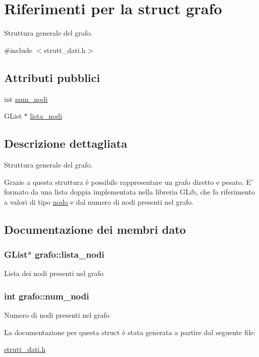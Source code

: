 \hypertarget{structgrafo}{\section{Riferimenti per la struct grafo}
\label{structgrafo}
}


Struttura generale del grafo.  




{\ttfamily \#include $<$strutt\+\_\+dati.\+h$>$}

\subsection*{Attributi pubblici}
\begin{DoxyCompactItemize}
\item 
int \hyperlink{structgrafo_ab05142298c5857ab9e14b52f4b3820e1}{num\+\_\+nodi}
\item 
G\+List $\ast$ \hyperlink{structgrafo_a95906e11ba3224fa9fed6b8b2882e576}{lista\+\_\+nodi}
\end{DoxyCompactItemize}


\subsection{Descrizione dettagliata}
Struttura generale del grafo. 

Grazie a questa struttura è possibile rappresentare un grafo diretto e pesato. E' formato da una lista doppia implementata nella libreria G\+Lib, che fa riferimento a valori di tipo \hyperlink{structnodo}{nodo} e dal numero di nodi presenti nel grafo. 

\subsection{Documentazione dei membri dato}
\hypertarget{structgrafo_a95906e11ba3224fa9fed6b8b2882e576}{
\subsubsection[{lista\+\_\+nodi}]{\setlength{\rightskip}{0pt plus 5cm}G\+List$\ast$ grafo\+::lista\+\_\+nodi}}\label{structgrafo_a95906e11ba3224fa9fed6b8b2882e576}
Lista dei nodi presenti nel grafo \hypertarget{structgrafo_ab05142298c5857ab9e14b52f4b3820e1}{
\subsubsection[{num\+\_\+nodi}]{\setlength{\rightskip}{0pt plus 5cm}int grafo\+::num\+\_\+nodi}}\label{structgrafo_ab05142298c5857ab9e14b52f4b3820e1}
Numero di nodi presenti nel grafo 

La documentazione per questa struct è stata generata a partire dal seguente file\+:\begin{DoxyCompactItemize}
\item 
\hyperlink{strutt__dati_8h}{strutt\+\_\+dati.\+h}\end{DoxyCompactItemize}
